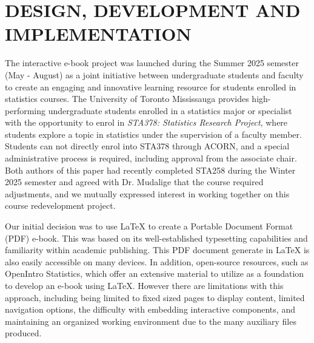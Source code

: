 \documentclass[11pt]{article}
\begin{document}
%
%


\section{DESIGN, DEVELOPMENT AND IMPLEMENTATION}
\label{sec:design}

The interactive e-book project was launched during the Summer 2025 semester (May - August) as a joint initiative between undergraduate students and faculty to create an engaging and innovative learning resource for students enrolled in statistics courses. 
The University of Toronto Mississauga provides high-performing undergraduate students enrolled in a statistics major or specialist with the opportunity to enrol in \textit{STA378: Statistics Research Project}, where students explore a topic in statistics under the supervision of a faculty member.
Students can not directly enrol into STA378 through ACORN, and a special administrative process is required, including approval from the associate chair.
Both authors of this paper had recently completed STA258 during the Winter 2025 semester and agreed with Dr. Mudalige that the course required adjustments, and we mutually expressed interest in working together on this course redevelopment project.

Our initial decision was to use LaTeX to create a Portable Document Format (PDF) e-book.
This was based on its well-established typesetting capabilities and familiarity within academic publishing.
This PDF document generate in LaTeX is also easily accessible on many devices.
In addition, open-source resources, such as OpenIntro Statistics, which offer an extensive material to utilize as a foundation to develop an e-book using LaTeX.
However there are limitations with this approach, including being limited to fixed sized pages to display content, limited navigation options, the difficulty with embedding interactive components, and maintaining an organized working environment due to the many auxiliary files produced.
\end{document}
